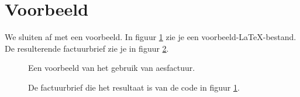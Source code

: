 \documentclass{article}
\newcommand\packagenaam{aesfactuur}
\newcommand\packagesf{\textsf{\packagenaam}}
\begin{document}


\section{Voorbeeld}

We sluiten af met een voorbeeld. 
In figuur \ref{fig:code} zie je een voorbeeld-\LaTeX-bestand. De resulterende factuurbrief zie je in figuur \ref{fig:factuur}.

\begin{figure}
\fbox{%
\begin{minipage}{\textwidth}

\end{minipage}%
}
\caption{Een voorbeeld van het gebruik van \packagesf.}
\label{fig:code}
\end{figure}

\begin{figure}
\caption{De factuurbrief die het resultaat is van de code in figuur \ref{fig:code}.}
\label{fig:factuur}
\end{figure}
\end{document}
